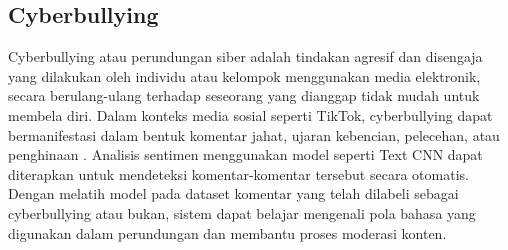 \subsection{Cyberbullying} \label{II.mae}


Cyberbullying atau perundungan siber adalah tindakan agresif dan disengaja yang dilakukan oleh individu atau kelompok menggunakan media elektronik, secara berulang-ulang terhadap seseorang yang dianggap tidak mudah untuk membela diri. Dalam konteks media sosial seperti TikTok, cyberbullying dapat bermanifestasi dalam bentuk komentar jahat, ujaran kebencian, pelecehan, atau penghinaan \cite{putri2023cyberbullying}. Analisis sentimen menggunakan model seperti Text CNN dapat diterapkan untuk mendeteksi komentar-komentar tersebut secara otomatis. Dengan melatih model pada dataset komentar yang telah dilabeli sebagai cyberbullying atau bukan, sistem dapat belajar mengenali pola bahasa yang digunakan dalam perundungan dan membantu proses moderasi konten.\par
